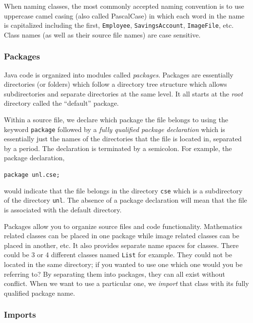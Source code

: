 When naming classes, the most commonly accepted naming convention 
is to use uppercase camel casing (also called PascalCase) in which each
word in the name is capitalized including the first, 
\texttt{Employee}, \texttt{SavingsAccount}, 
\texttt{ImageFile}, etc.  Class names (as well as their source file
names) are case sensitive.

\subsubsection{Packages}

Java code is organized into modules called \emph{packages}.  Packages
are essentially directories (or folders) which follow a directory tree 
structure which allows subdirectories and separate directories at the same
level.  It all starts at the \emph{root} directory called the ``default'' package.

Within a source file, we declare which package the file belongs to using
the keyword \texttt{package} followed by a \emph{fully qualified
package declaration} which is essentially just the names of the directories
that the file is located in, separated by a period.  The declaration is terminated
by a semicolon.  For example, the package declaration, 

\texttt{package unl.cse;}

would indicate that the file belongs in the directory \texttt{cse}
which is a subdirectory of the directory \texttt{unl}.  The
absence of a package declaration will mean that the file is associated
with the default directory.  

Packages allow you to organize source files and code functionality.  
Mathematics related classes can be placed in one package while 
image related classes can be placed in another, etc.  It also provides
separate name spaces for classes.  There could be 3 or 4 different
classes named \texttt{List} for example.  They could not
be located in the same directory; if you wanted to use one
which one would you be referring to?  By separating them into 
packages, they can all exist without conflict.  When we want to
use a particular one, we \emph{import} that class with its fully
qualified package name.

\subsubsection{Imports}

